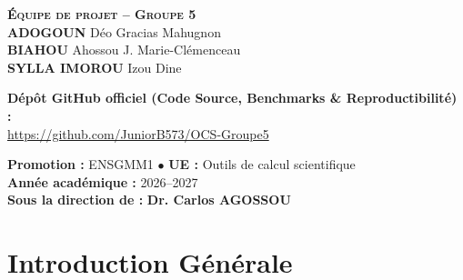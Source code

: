 \documentclass[11pt,a4paper]{report}
\theoremstyle{plain}
\theoremstyle{definition}
\theoremstyle{remark}
\begin{document}
\begin{titlepage}
    \vspace{0.55cm}

    {\fontsize{12.5}{15}\selectfont \textbf{\textcolor{navyblue}{\textsc{Équipe de projet -- Groupe 5}}}}\\[0.35cm]
    {\large \textbf{ADOGOUN}} Déo Gracias Mahugnon\\[0.15cm]
    {\large \textbf{BIAHOU}} Ahossou J. Marie-Clémenceau\\[0.15cm]
    {\large \textbf{SYLLA IMOROU}} Izou Dine

    \vspace{0.4cm}

    \begin{tcolorbox}[
        colback=lightbg,
        colframe=royalblue!40,
        boxrule=0.6pt,
        arc=3pt,
        width=0.92\textwidth,
        halign=center
    ]
        \footnotesize
        \textbf{\textcolor{navyblue}{Dépôt GitHub officiel (Code Source, Benchmarks \& Reproductibilité) :}}\\[0.08cm]
        \url{https://github.com/JuniorB573/OCS-Groupe5}
    \end{tcolorbox}

    \vfill

    \begin{tcolorbox}[
        colback=lightbg,
        colframe=gray!40,
        boxrule=0.5pt,
        arc=3pt,
        width=0.92\textwidth,
        halign=center
    ]
        \centering
        \small
        \textbf{Promotion :} ENSGMM1 \quad $\bullet$ \quad \textbf{UE :} Outils de calcul scientifique\\[0.1cm]
        \textbf{Année académique :} 2026--2027\\[0.15cm]
        \textbf{Sous la direction de :} \textbf{\textcolor{navyblue}{Dr. Carlos AGOSSOU}}
    \end{tcolorbox}
    \vspace*{-0.2cm}
\end{titlepage}

\newpage
{}
\setcounter{page}{1}
\tableofcontents
\newpage

\chapter*{Introduction Générale}
\end{document}
